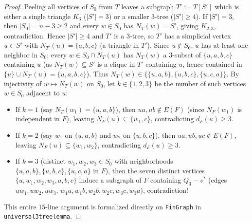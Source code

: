 \documentclass[11pt,reqno]{amsart}
\theoremstyle{plain}
\theoremstyle{definition}
\theoremstyle{remark}
\DeclareRobustCommand{\_}{\ifmmode\text{\textunderscore}\else\textunderscore\allowbreak\fi}
\begin{document}
\begin{proof}
Peeling all vertices of $S_0$ from $T$ leaves a subgraph $T' := T[S']$ which is either a single triangle $K_3$ ($|S'| = 3$) or a smaller $3$-tree ($|S'| \ge 4$). If $|S'| = 3$, then $|S_0| = n - 3 \ge 2$ and every $w \in S_0$ has $N_T(w) = S'$, giving $K_{2,3}$, contradiction. Hence $|S'| \ge 4$ and $T'$ is a $3$-tree, so $T'$ has a simplicial vertex $u \in S'$ with $N_{T'}(u) = \{a, b, c\}$ (a triangle in $T'$). Since $u \notin S_0$, $u$ has at least one neighbor in $S_0$; every $w \in S_0 \cap N_T(u)$ has $N_T(w)$ a $3$-subset of $\{u, a, b, c\}$ containing $u$ (as $N_T(w) \subseteq S'$ is a clique in $T'$ containing $u$, hence contained in $\{u\} \cup N_{T'}(u) = \{u, a, b, c\}$). Thus $N_T(w) \in \{\{u, a, b\}, \{u, b, c\}, \{u, c, a\}\}$. By injectivity of $w \mapsto N_T(w)$ on $S_0$, let $k \in \{1, 2, 3\}$ be the number of such vertices $w \in S_0$ adjacent to $u$:
\begin{itemize}[leftmargin=1.6em]
  \item If $k = 1$ (say $N_T(w_1) = \{u, a, b\}$), then $u a, u b \notin E(F)$ (since $N_F(w_1)$ is independent in $F$), leaving $N_F(u) \subseteq \{w_1, c\}$, contradicting $d_F(u) \ge 3$.
  \item If $k = 2$ (say $w_1$ on $\{u, a, b\}$ and $w_2$ on $\{u, b, c\}$), then $u a, u b, u c \notin E(F)$, leaving $N_F(u) \subseteq \{w_1, w_2\}$, contradicting $d_F(u) \ge 3$.
  \item If $k = 3$ (distinct $w_1, w_2, w_3 \in S_0$ with neighborhoods $\{u, a, b\}, \{u, b, c\}, \{u, c, a\}$ in $F$), then the seven distinct vertices $\{u, w_1, w_2, w_3, a, b, c\}$ induce a subgraph of $F$ containing $Q_3 - v^*$ (edges $u w_1, u w_2, u w_3$, $w_1 a, w_1 b, w_2 b, w_2 c, w_3 c, w_3 a$), contradiction!
\end{itemize}
This entire $15$-line argument is formalized directly on \texttt{FinGraph} in \texttt{universal\_3tree\_lemma}.
\end{proof}
\end{document}
